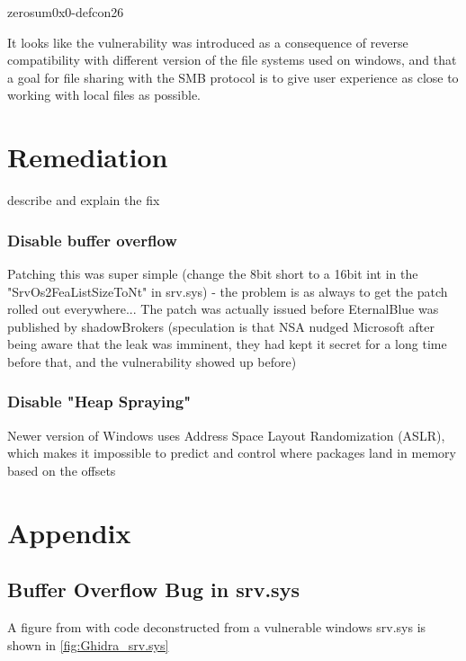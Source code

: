 \documentclass[
	letterpaper, %
	10pt, %
	unnumberedsections, %
	twoside, %
]{LTJournalArticle}
\begin{document}
zerosum0x0-defcon26



It looks like the vulnerability was introduced as a consequence of reverse compatibility with different version of the file systems used on windows, and that a goal for file sharing with the SMB protocol is to give user experience as close to working with local files as possible.  




\section{Remediation} 
describe and explain the fix

\subsubsection{Disable buffer overflow}
Patching this was super simple (change the 8bit short to a 16bit int in the "SrvOs2FeaListSizeToNt" in srv.sys) - the problem is as always to get the patch rolled out everywhere...
The patch was actually issued before EternalBlue was published by shadowBrokers (speculation is that NSA nudged Microsoft after being aware that the leak was imminent, they had kept it secret for a long time before that, and the vulnerability showed up before)

\subsubsection{Disable "Heap Spraying"}
Newer version of Windows uses Address Space Layout Randomization (ASLR), which makes it impossible to predict and control where packages land in memory based on the offsets 





\printbibliography %

\clearpage
\appendix
\section{Appendix} \label{Appendix}

\subsection{Buffer Overflow Bug in srv.sys}
A figure from \cite{h3xduck} with code deconstructed from a vulnerable windows srv.sys is shown in \ref{fig:Ghidra_srv.sys}
\end{document}
